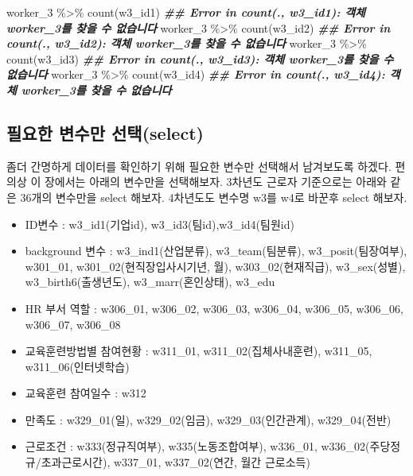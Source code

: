 \documentclass[
]{book}
\newenvironment{Shaded}{\begin{snugshade}}{\end{snugshade}}
\newcommand{\DocumentationTok}[1]{\textcolor[rgb]{0.56,0.35,0.01}{\textbf{\textit{#1}}}}
\newcommand{\FunctionTok}[1]{\textcolor[rgb]{0.00,0.00,0.00}{#1}}
\newcommand{\NormalTok}[1]{#1}
\newcommand{\SpecialCharTok}[1]{\textcolor[rgb]{0.00,0.00,0.00}{#1}}
\providecommand{\tightlist}{%
  \setlength{\itemsep}{0pt}\setlength{\parskip}{0pt}}
\theoremstyle{definition}
\theoremstyle{definition}
\theoremstyle{definition}
\theoremstyle{definition}
\theoremstyle{remark}
\begin{document}
\begin{Shaded}
\begin{Highlighting}[]
\NormalTok{worker\_3 }\SpecialCharTok{\%\textgreater{}\%} 
  \FunctionTok{count}\NormalTok{(w3\_id1)}
\DocumentationTok{\#\# Error in count(., w3\_id1): 객체 \textquotesingle{}worker\_3\textquotesingle{}를 찾을 수 없습니다}
\NormalTok{worker\_3 }\SpecialCharTok{\%\textgreater{}\%} 
  \FunctionTok{count}\NormalTok{(w3\_id2)}
\DocumentationTok{\#\# Error in count(., w3\_id2): 객체 \textquotesingle{}worker\_3\textquotesingle{}를 찾을 수 없습니다}
\NormalTok{worker\_3 }\SpecialCharTok{\%\textgreater{}\%} 
  \FunctionTok{count}\NormalTok{(w3\_id3)}
\DocumentationTok{\#\# Error in count(., w3\_id3): 객체 \textquotesingle{}worker\_3\textquotesingle{}를 찾을 수 없습니다}
\NormalTok{worker\_3 }\SpecialCharTok{\%\textgreater{}\%} 
  \FunctionTok{count}\NormalTok{(w3\_id4)}
\DocumentationTok{\#\# Error in count(., w3\_id4): 객체 \textquotesingle{}worker\_3\textquotesingle{}를 찾을 수 없습니다}
\end{Highlighting}
\end{Shaded}

\hypertarget{uxd544uxc694uxd55c-uxbcc0uxc218uxb9cc-uxc120uxd0ddselect}{%
\subsection{필요한 변수만 선택(select)}\label{uxd544uxc694uxd55c-uxbcc0uxc218uxb9cc-uxc120uxd0ddselect}}

좀더 간명하게 데이터를 확인하기 위해 필요한 변수만 선택해서 남겨보도록 하겠다. 편의상 이 장에서는 아래의 변수만을 선택해보자. 3차년도 근로자 기준으로는 아래와 같은 36개의 변수만을 select 해보자. 4차년도도 변수명 w3를 w4로 바꾼후 select 해보자.

\begin{itemize}
\tightlist
\item
  ID변수 : w3\_id1(기업id), w3\_id3(팀id),w3\_id4(팀원id)
\item
  background 변수 : w3\_ind1(산업분류), w3\_team(팀분류), w3\_posit(팀장여부), w301\_01, w301\_02(현직장입사시기년, 월), w303\_02(현재직급), w3\_sex(성별), w3\_birth6(출생년도), w3\_marr(혼인상태), w3\_edu
\item
  HR 부서 역할 : w306\_01, w306\_02, w306\_03, w306\_04, w306\_05, w306\_06, w306\_07, w306\_08
\item
  교육훈련방법별 참여현황 : w311\_01, w311\_02(집체사내훈련), w311\_05, w311\_06(인터넷학습)
\item
  교육훈련 참여일수 : w312
\item
  만족도 : w329\_01(일), w329\_02(임금), w329\_03(인간관계), w329\_04(전반)
\item
  근로조건 : w333(정규직여부), w335(노동조합여부), w336\_01, w336\_02(주당정규/초과근로시간), w337\_01, w337\_02(연간, 월간 근로소득)
\end{itemize}
\end{document}
